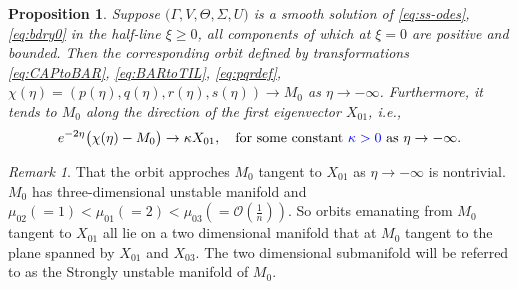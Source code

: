 \documentclass[a4paper,11pt]{article}
\def\blue{\color{blue}}
\def\BO{{\mathcal{O}}}
\newtheorem{proposition}{Proposition}[section]
\theoremstyle{remark}
\newtheorem{remark}{Remark}[section]
\begin{document}
\begin{proposition} \label{prop1}
    Suppose $\big(\Gamma,V,\Theta,\Sigma,U\big)$ is a {\blue smooth solution of \eqref{eq:ss-odes}, \eqref{eq:bdry0} in the half-line $\xi\ge0$, all components of which at $\xi=0$ are positive and bounded.} Then the corresponding orbit defined by transformations \eqref{eq:CAPtoBAR}, \eqref{eq:BARtoTIL}, {\blue \eqref{eq:pqrdef},} $\chi(\eta) = (p(\eta), q(\eta), r(\eta),s(\eta)) \rightarrow M_0$ as $\eta \rightarrow -\infty$. Furthermore, it tends to $M_0$ along the direction of the first eigenvector $X_{01}$, i.e.,
    \begin{equation} \label{eq:alpha}
     e^{-2\eta}\big(\chi(\eta) - M_0 \big) \rightarrow \kappa X_{01}, \quad \text{for some constant {\blue $\kappa>0$} as $\eta \rightarrow -\infty$.}
    \end{equation}
\end{proposition}

\begin{remark} \label{rem:alpha}
  {\blue That the orbit approches $M_0$ tangent to $X_{01}$ as $\eta \rightarrow -\infty$} is nontrivial. $M_0$ has three-dimensional unstable manifold and $\mu_{02}(=1)<\mu_{01}(=2)<\mu_{03}(=\BO(\frac{1}{n}))$. %
  {\blue So orbits emanating from $M_0$ tangent to $X_{01}$ all lie on a two dimensional manifold that at $M_0$ tangent to the plane spanned by $X_{01}$ and $X_{03}$. The two dimensional submanifold will be referred to as the Strongly unstable manifold of $M_0$.}
\end{remark}
\end{document}
